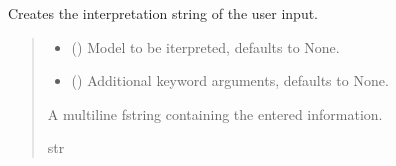 \documentclass[letterpaper,10pt,english]{sphinxmanual}
\begin{document}
\begin{fulllineitems}
\begin{fulllineitems}
\end{fulllineitems}


\begin{fulllineitems}
\label{\detokenize{CTkInterface:src.CTkInterface.MainApp.create_interpretation_string}}
\pysigstartsignatures
{}
\pysigstopsignatures
\sphinxAtStartPar
Creates the interpretation string of the user input.
\begin{quote}\begin{description}
\begin{itemize}
\item {} 
\sphinxAtStartPar
{} ({\hyperref[\detokenize{VPCModel:src.VPCModel.VPCModel}]{}}\sphinxstyleliteralemphasis{\sphinxupquote{, }}) \textendash{} Model to be iterpreted, defaults to None.

\item {} 
\sphinxAtStartPar
{} (\sphinxstyleliteralemphasis{\sphinxupquote{ | }}) \textendash{} Additional keyword arguments, defaults to None.

\end{itemize}

\sphinxAtStartPar
A multi\sphinxhyphen{}line f\sphinxhyphen{}string containing the entered information.

\sphinxAtStartPar
str

\end{description}\end{quote}


\end{fulllineitems}
\end{fulllineitems}
\end{document}
